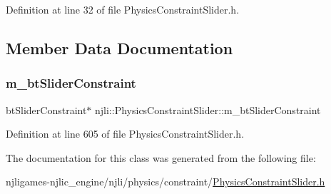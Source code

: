 Definition at line 32 of file Physics\+Constraint\+Slider.\+h.



\subsection{Member Data Documentation}
\mbox{\label{classnjli_1_1_physics_constraint_slider_abeac39c96abf6541fba28c9630f3edd6}} 
\subsubsection{\texorpdfstring{m\+\_\+bt\+Slider\+Constraint}{m\_btSliderConstraint}}
{\footnotesize\ttfamily bt\+Slider\+Constraint$\ast$ njli\+::\+Physics\+Constraint\+Slider\+::m\+\_\+bt\+Slider\+Constraint\hspace{0.3cm}{\ttfamily [private]}}



Definition at line 605 of file Physics\+Constraint\+Slider.\+h.



The documentation for this class was generated from the following file\+:\begin{DoxyCompactItemize}
\item 
njligames-\/njlic\+\_\+engine/njli/physics/constraint/\mbox{\hyperlink{_physics_constraint_slider_8h}{Physics\+Constraint\+Slider.\+h}}\end{DoxyCompactItemize}
